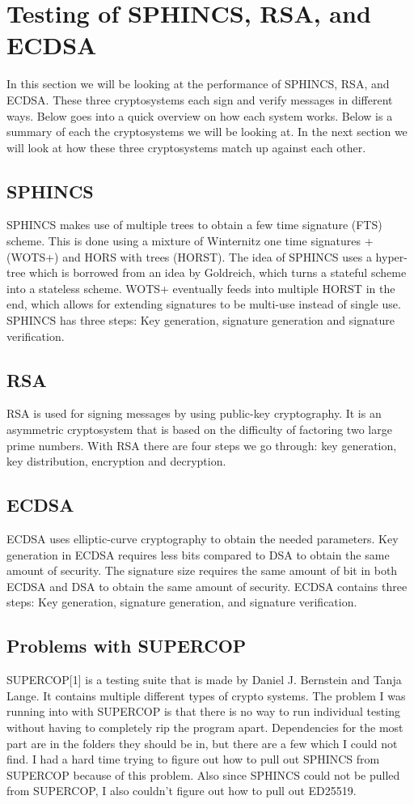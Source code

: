 \documentclass[12pt,a4paper]{article}
\begin{document}
\section*{Testing of SPHINCS, RSA, and ECDSA}
In this section we will be looking at the performance of SPHINCS, RSA, and ECDSA. These three cryptosystems each sign and verify messages in different ways. Below goes into a quick overview on how each system works. Below is a summary of each the cryptosystems we will be looking at. In the next section we will look at how these three cryptosystems match up against each other.

\subsection*{SPHINCS}
SPHINCS makes use of multiple trees to obtain a few time signature (FTS) scheme. This is done using a mixture of Winternitz one time signatures + (WOTS+) and HORS with trees (HORST). The idea of SPHINCS uses a hyper-tree which is borrowed from an idea by Goldreich, which turns a stateful scheme into a stateless scheme. WOTS+ eventually feeds into multiple HORST in the end, which allows for extending signatures to be multi-use instead of single use. SPHINCS has three steps: Key generation, signature generation and signature verification.

\subsection*{RSA}
RSA is used for signing messages by using public-key cryptography. It is an asymmetric cryptosystem that is based on the difficulty of factoring two large prime numbers. With RSA there are four steps we go through: key generation, key distribution, encryption and decryption.

\subsection*{ECDSA}
ECDSA uses elliptic-curve cryptography to obtain the needed parameters. Key generation in ECDSA requires less bits compared to DSA to obtain the same amount of security. The signature size requires the same amount of bit in both ECDSA and DSA to obtain the same amount of security. ECDSA contains three steps: Key generation, signature generation, and signature verification.

\subsection*{Problems with SUPERCOP}
SUPERCOP[1] is a testing suite that is made by Daniel J. Bernstein and Tanja Lange. It contains multiple different types of crypto systems. The problem I was running into with SUPERCOP is that there is no way to run individual testing without having to completely rip the program apart. Dependencies for the most part are in the folders they should be in, but there are a few which I could not find. I had a hard time trying to figure out how to pull out SPHINCS from SUPERCOP because of this problem. Also since SPHINCS could not be pulled from SUPERCOP, I also couldn't figure out how to pull out ED25519.
\end{document}
